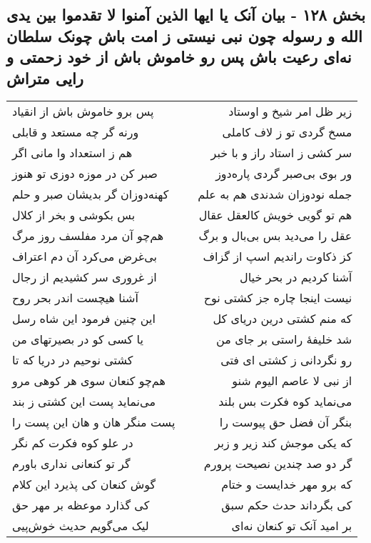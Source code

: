 \begin{center}
\section*{بخش ۱۲۸ - بیان آنک یا ایها الذین آمنوا لا تقدموا بین یدی الله و رسوله  چون نبی نیستی ز امت باش  چونک سلطان نه‌ای رعیت باش پس رو خاموش باش از خود زحمتی و رایی متراش}
\label{sec:sh128}
\begin{longtable}{l p{0.5cm} r}
پس برو خاموش باش از انقیاد
&&
زیر ظل امر شیخ و اوستاد
\\
ورنه گر چه مستعد و قابلی
&&
مسخ گردی تو ز لاف کاملی
\\
هم ز استعداد وا مانی اگر
&&
سر کشی ز استاد راز و با خبر
\\
صبر کن در موزه دوزی تو هنوز
&&
ور بوی بی‌صبر گردی پاره‌دوز
\\
کهنه‌دوزان گر بدیشان صبر و حلم
&&
جمله نودوزان شدندی هم به علم
\\
بس بکوشی و بخر از کلال
&&
هم تو گویی خویش کالعقل عقال
\\
هم‌چو آن مرد مفلسف روز مرگ
&&
عقل را می‌دید بس بی‌بال و برگ
\\
بی‌غرض می‌کرد آن دم اعتراف
&&
کز ذکاوت راندیم اسپ از گزاف
\\
از غروری سر کشیدیم از رجال
&&
آشنا کردیم در بحر خیال
\\
آشنا هیچست اندر بحر روح
&&
نیست اینجا چاره جز کشتی نوح
\\
این چنین فرمود این شاه رسل
&&
که منم کشتی درین دریای کل
\\
یا کسی کو در بصیرتهای من
&&
شد خلیفهٔ راستی بر جای من
\\
کشتی نوحیم در دریا که تا
&&
رو نگردانی ز کشتی ای فتی
\\
هم‌چو کنعان سوی هر کوهی مرو
&&
از نبی لا عاصم الیوم شنو
\\
می‌نماید پست این کشتی ز بند
&&
می‌نماید کوه فکرت بس بلند
\\
پست منگر هان و هان این پست را
&&
بنگر آن فضل حق پیوست را
\\
در علو کوه فکرت کم نگر
&&
که یکی موجش کند زیر و زبر
\\
گر تو کنعانی نداری باورم
&&
گر دو صد چندین نصیحت پرورم
\\
گوش کنعان کی پذیرد این کلام
&&
که برو مهر خدایست و ختام
\\
کی گذارد موعظه بر مهر حق
&&
کی بگرداند حدث حکم سبق
\\
لیک می‌گویم حدیث خوش‌پیی
&&
بر امید آنک تو کنعان نه‌ای
\\

\end{longtable}
\end{center}
